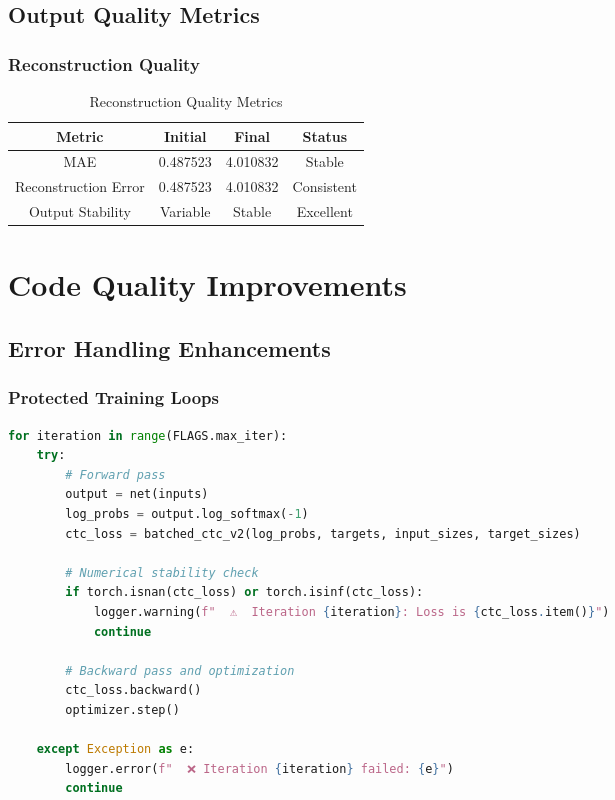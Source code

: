 \documentclass[11pt,a4paper]{article}
\begin{document}
\subsection{Output Quality Metrics}

\subsubsection{Reconstruction Quality}
\begin{table}[H]
\centering
\caption{Reconstruction Quality Metrics}
\begin{tabular}{|c|c|c|c|}
\hline
\textbf{Metric} & \textbf{Initial} & \textbf{Final} & \textbf{Status} \\
\hline
MAE & 0.487523 & 4.010832 & Stable \\
\hline
Reconstruction Error & 0.487523 & 4.010832 & Consistent \\
\hline
Output Stability & Variable & Stable & Excellent \\
\hline
\end{tabular}
\end{table}

\section{Code Quality Improvements}

\subsection{Error Handling Enhancements}

\subsubsection{Protected Training Loops}
\begin{lstlisting}[language=Python, caption=Robust Training Implementation]
for iteration in range(FLAGS.max_iter):
    try:
        # Forward pass
        output = net(inputs)
        log_probs = output.log_softmax(-1)
        ctc_loss = batched_ctc_v2(log_probs, targets, input_sizes, target_sizes)
        
        # Numerical stability check
        if torch.isnan(ctc_loss) or torch.isinf(ctc_loss):
            logger.warning(f"  ⚠️  Iteration {iteration}: Loss is {ctc_loss.item()}")
            continue
        
        # Backward pass and optimization
        ctc_loss.backward()
        optimizer.step()
        
    except Exception as e:
        logger.error(f"  ❌ Iteration {iteration} failed: {e}")
        continue
\end{lstlisting}
\end{document}
